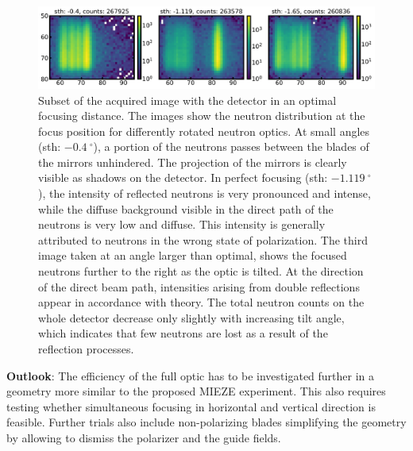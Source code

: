 \documentclass[12pt]{article}
\begin{document}
\begin{figure}[y]
	\centering
	\includegraphics[width=1\textwidth]{./figures_report/focus}
	\caption{Subset of the acquired image with the detector in an optimal focusing distance. The images show the neutron distribution at the focus position for differently rotated neutron optics. At small angles (sth: $\SI{-0.4}{^\circ}$), a portion of the neutrons passes between the blades of the mirrors unhindered. The projection of the mirrors is clearly visible as shadows on the detector. In perfect focusing (sth: $\SI{-1.119}{^\circ}$), the intensity of reflected neutrons is very pronounced and intense, while the diffuse background visible in the direct path of the neutrons is very low and diffuse. This intensity is generally attributed to neutrons in the wrong state of polarization. The third image taken at an angle larger than optimal, shows the focused neutrons further to the right as the optic is tilted. At the direction of the direct beam path, intensities arising from double reflections appear in accordance with theory. The total neutron counts on the whole detector decrease only slightly with increasing tilt angle, which indicates that few neutrons are lost as a result of the reflection processes.}
	\label{fig:allthree}
\end{figure}

\noindent\textbf{Outlook}:
The efficiency of the full optic has to be investigated further in a geometry more similar to the proposed MIEZE experiment. This also requires testing whether simultaneous focusing in horizontal and vertical direction is feasible. Further trials also include non-polarizing blades simplifying the geometry by allowing to dismiss the polarizer and the guide fields.



\end{document}
